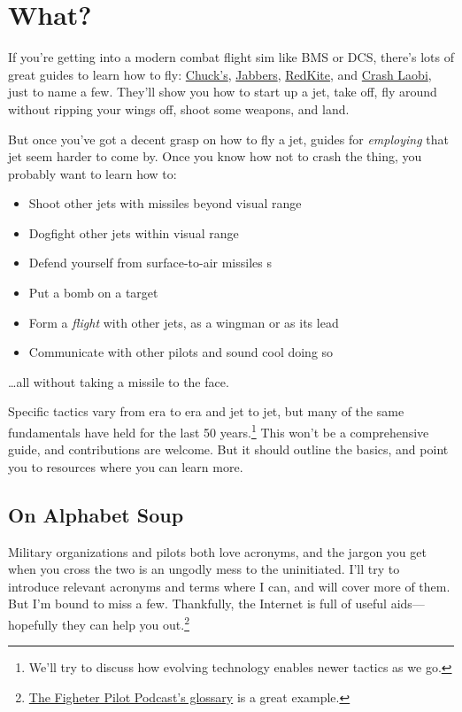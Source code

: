 \chapter{What?}

If you're getting into a modern combat flight sim like BMS or DCS,
there's lots of great guides to learn how to fly:
\href{https://www.mudspike.com/chucks-guides/}{Chuck's},
\href{https://www.youtube.com/channel/UCvXXUrGCF3wV3bbZ6pFQ00g}{Jabbers},
\href{https://www.youtube.com/user/RedKiteRender}{RedKite},
and
\href{https://www.youtube.com/channel/UCqH078Ef0HENo01LF3xwIvA}{Crash Laobi},
just to name a few.
They'll show you how to start up a jet, take off, fly around
without ripping your wings off, shoot some weapons, and land.

But once you've got a decent grasp on how to fly a jet,
guides for \emph{employing} that jet seem harder to come by.
Once you know how not to crash the thing, you probably want to learn how to:
\begin{itemize}
\item Shoot other jets with missiles beyond visual range 
\item Dogfight other jets within visual range 
\item Defend yourself from surface-to-air missiles s
\item Put a bomb on a target
\item Form a \emph{flight} with other jets, as a wingman or as its lead
\item Communicate with other pilots and sound cool doing so
\end{itemize}
\dots all without taking a missile to the face.

Specific tactics vary from era to era and jet to jet,
but many of the same fundamentals have held for the last 50
years.\punckern\footnote{We'll try to discuss how evolving technology
enables newer tactics as we go.}
This won't be a comprehensive guide,
and contributions are welcome.
But it should outline the basics, and point you to resources where you can
learn more.

\section{On Alphabet Soup}

Military organizations and pilots both love acronyms,
and the jargon you get when you cross the two is an ungodly mess
to the uninitiated.
I'll try to introduce relevant acronyms and terms where I can,
and  will cover more of them.
But I'm bound to miss a few.
Thankfully, the Internet is full of useful aids---hopefully they can help you
out.\punckern\footnote{%
\href{https://www.fighterpilotpodcast.com/glossary/}{The Figheter Pilot Podcast's glossary}
is a great example.}
